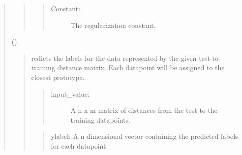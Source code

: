 \documentclass[letterpaper,10pt,english,openany,oneside]{sphinxmanual}
\begin{document}
\begin{quote}
\begin{quote}
\begin{quote}
\begin{description}
\item[{Constant:}] \leavevmode
The regularization constant.

\end{description}
\end{quote}
\end{quote}

()
\begin{quote}

redicts the labels for the data represented by the given test-to-training distance matrix. Each datapoint will be assigned to the closest prototype.

\begin{quote}
\begin{description}
\item[{input\_value:}] \leavevmode
A n x m matrix of distances from the test to the training datapoints.

\end{description}
\end{quote}

\begin{quote}

ylabel:
A n-dimensional vector containing the predicted labels for each datapoint.
\end{quote}
\end{quote}
\end{quote}



\renewcommand{\indexname}{Index}
\printindex
\end{document}
